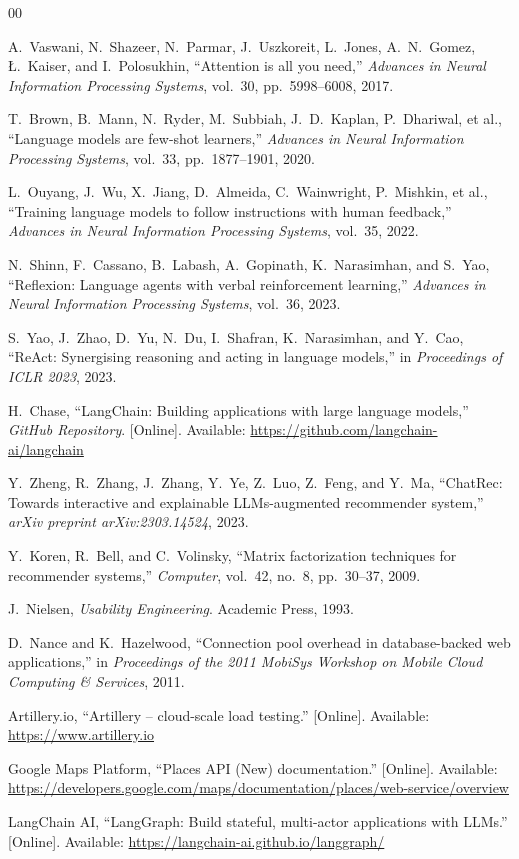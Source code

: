 \documentclass[conference]{IEEEtran}
\begin{document}
\begin{thebibliography}{00}

A.~Vaswani, N.~Shazeer, N.~Parmar, J.~Uszkoreit, L.~Jones, A.~N.~Gomez,
\L.~Kaiser, and I.~Polosukhin, ``Attention is all you need,''
\textit{Advances in Neural Information Processing Systems}, vol.~30, pp.~5998--6008, 2017.

T.~Brown, B.~Mann, N.~Ryder, M.~Subbiah, J.~D.~Kaplan, P.~Dhariwal, et al.,
``Language models are few-shot learners,''
\textit{Advances in Neural Information Processing Systems}, vol.~33, pp.~1877--1901, 2020.

L.~Ouyang, J.~Wu, X.~Jiang, D.~Almeida, C.~Wainwright, P.~Mishkin, et al.,
``Training language models to follow instructions with human feedback,''
\textit{Advances in Neural Information Processing Systems}, vol.~35, 2022.

N.~Shinn, F.~Cassano, B.~Labash, A.~Gopinath, K.~Narasimhan, and S.~Yao,
``Reflexion: Language agents with verbal reinforcement learning,''
\textit{Advances in Neural Information Processing Systems}, vol.~36, 2023.

S.~Yao, J.~Zhao, D.~Yu, N.~Du, I.~Shafran, K.~Narasimhan, and Y.~Cao,
``ReAct: Synergising reasoning and acting in language models,''
in \textit{Proceedings of ICLR 2023}, 2023.

H.~Chase, ``LangChain: Building applications with large language models,''
\textit{GitHub Repository}. [Online]. Available: \url{https://github.com/langchain-ai/langchain}

Y.~Zheng, R.~Zhang, J.~Zhang, Y.~Ye, Z.~Luo, Z.~Feng, and Y.~Ma,
``ChatRec: Towards interactive and explainable LLMs-augmented recommender system,''
\textit{arXiv preprint arXiv:2303.14524}, 2023.

Y.~Koren, R.~Bell, and C.~Volinsky,
``Matrix factorization techniques for recommender systems,''
\textit{Computer}, vol.~42, no.~8, pp.~30--37, 2009.

J.~Nielsen, \textit{Usability Engineering}. Academic Press, 1993.

D.~Nance and K.~Hazelwood,
``Connection pool overhead in database-backed web applications,''
in \textit{Proceedings of the 2011 MobiSys Workshop on Mobile Cloud Computing \& Services}, 2011.

Artillery.io, ``Artillery -- cloud-scale load testing.''
[Online]. Available: \url{https://www.artillery.io}

Google Maps Platform, ``Places API (New) documentation.''
[Online]. Available: \url{https://developers.google.com/maps/documentation/places/web-service/overview}

LangChain AI, ``LangGraph: Build stateful, multi-actor applications with LLMs.''
[Online]. Available: \url{https://langchain-ai.github.io/langgraph/}

\end{thebibliography}
\end{document}
